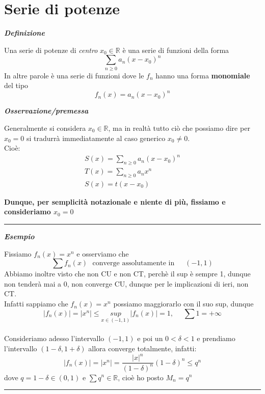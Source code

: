\documentclass{article}
\theoremstyle{definition}
\newcommand{\linea}{\vspace{15pt}\hrule\vspace{15pt}}
\newcommand{\R}{\mathbb{R}}
\begin{document}
\section{Serie di potenze}
\begin{center}
    \textbf{\textit{Definizione}}
\end{center}
Una serie di potenze di \textit{centro} $x_0 \in \R$ è una serie di funzioni della forma
\begin{equation}
    \sum_{n \geqslant 0}a_n(x-x_0)^n
\end{equation}
In altre parole è una serie di funzioni dove le $f_n$ hanno una forma \textbf{monomiale} del tipo 
\begin{equation}
    f_n(x)=a_n(x-x_0)^n
\end{equation}
\begin{center}
    \textbf{\textit{Osservazione/premessa}}
\end{center}
Generalmente si considera $x_0 \in \R$, ma in realtà tutto ciò che possiamo dire per $x_0=0$ si tradurrà immediatamente al caso generico $x_0 \neq 0$.
\\
Cioè:
\begin{align}
    S(x)=\sum_{n \geqslant 0}a_n(x-x_0)^n \\
    T(x)= \sum_{n \geqslant 0} a_nx^n \\
    S(x)=t(x-x_0)
\end{align}
\begin{center}
\textbf{Dunque, per semplicità notazionale e niente di più, fissiamo e consideriamo $x_0=0$}
\end{center}
\linea
\begin{center}
    \textbf{\textit{Esempio}}
\end{center}
Fissiamo $f_n(x)=x^n$ e osserviamo che
\begin{equation}
    \sum f_n(x) \,\,\,\, \mbox{converge assolutamente in }\,\,\,\,\,\,\, (-1,1)
\end{equation}
Abbiamo inoltre visto che non CU e non CT, perchè il sup è sempre 1, dunque non tenderà mai a 0, non converge CU, dunque per le implicazioni di ieri, non CT.
\\
Infatti sappiamo che $f_n(x)=x^n$ possiamo maggiorarlo con il suo sup, dunque
\begin{equation}
    |f_n(x)|=|x^n| \leqslant \underset{x \in (-1,1)}{sup}|f_n(x)|=1, \,\,\,\,\,\,\,\, \sum 1= +\infty
\end{equation}
\\
Consideriamo adesso l'intervallo $(-1,1)$ e poi un $ 0<\delta < 1$ e prendiamo l'intervallo $(1-\delta, 1+ \delta)$ allora converge totalmente, infatti:
\begin{equation}
    \left|f_n(x)\right|=|x^n|=\frac{|x|^n}{(1-\delta)^n}(1-\delta)^n \leqslant q ^n
\end{equation}
dove $q=1 - \delta \in (0,1)$ e $\sum q^n \in \R$, cioè ho posto $M_n=q^n$
\linea
\end{document}
